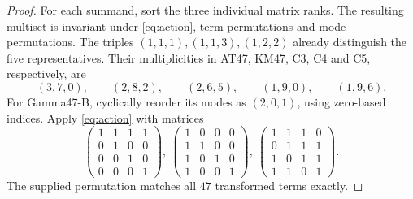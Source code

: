 \documentclass[11pt,reqno]{amsart}
\begin{document}
\begin{proof}
For each summand, sort the three individual matrix ranks. The resulting multiset is invariant under \eqref{eq:action}, term permutations and mode permutations. The triples \((1,1,1),(1,1,3),(1,2,2)\) already distinguish the five representatives. Their multiplicities in AT47, KM47, C3, C4 and C5, respectively, are
\[
 (3,7,0),\qquad (2,8,2),\qquad (2,6,5),\qquad (1,9,0),\qquad (1,9,6).
\] For Gamma47-B, cyclically reorder its modes as \((2,0,1)\), using zero-based indices. Apply \eqref{eq:action} with matrices
\[
 \begin{pmatrix}1&1&1&1\\0&1&0&0\\0&0&1&0\\0&0&0&1\end{pmatrix},\
 \begin{pmatrix}1&0&0&0\\1&1&0&0\\1&0&1&0\\1&0&0&1\end{pmatrix},\
 \begin{pmatrix}1&1&1&0\\0&1&1&1\\1&0&1&1\\1&1&0&1\end{pmatrix}.
\]
The supplied permutation matches all \(47\) transformed terms exactly.
\end{proof}
\end{document}
